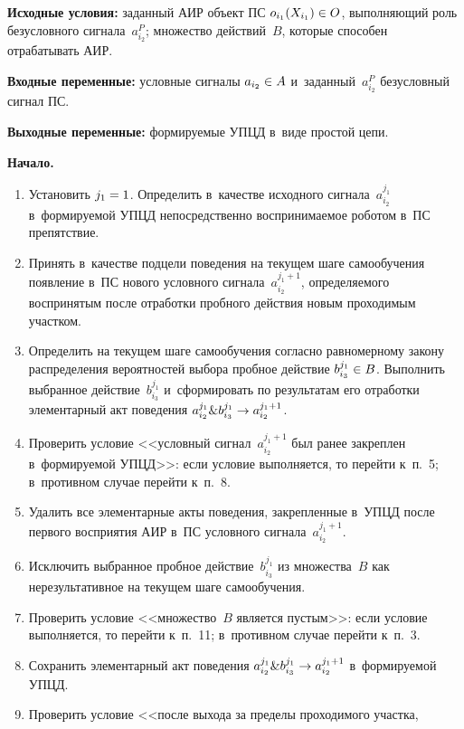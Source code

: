 \begin{multicols}{2}
\noindent
  \textbf{Исходные условия:} заданный АИР объект ПС 
$o_{i_1}(X_{i_1})\hm\in O$, выполняющий роль без\-услов\-но\-го 
сигнала~$a_{i_2}^P$; множество действий~$B$, которые способен 
отрабатывать АИР.
  
 \noindent
  \textbf{Входные переменные:} услов\-ные сигналы $a_{i_2}\hm\in A$ 
и~заданный~$a^P_{i_2}$ безусловный сигнал ПС.
  
 \noindent
  \textbf{Выходные переменные:} фор\-ми\-ру\-емые УПЦД в~виде прос\-той цепи. 
  
\smallskip
  
 \noindent
  \textbf{Начало.}\\[-12pt]
  \begin{enumerate}[1.]
\item  Установить $j_1\hm=1$. Определить в~качестве исходного 
сигнала~$a_{i_2}^{j_1}$ в~фор\-ми\-ру\-емой УПЦД непосредственно 
воспринимаемое роботом в~ПС препятствие. 
  \item  Принять в~качестве подцели поведения на текущем шаге самообучения 
появление в~ПС нового условного сигнала~$a_{i_2}^{j_1+1}$, 
опре\-де\-ля\-емо\-го воспринятым после отработки проб\-но\-го действия новым 
проходимым участ\-ком. 
  \item  Определить на текущем шаге самообучения согласно равномерному 
закону распределения вероятностей выбора проб\-ное действие 
$b^{j_1}_{i_3}\hm\in B$. Выполнить выбранное действие~$b^{j_1}_{i_3}$ 
и~сформировать по результатам его отработки элементарный акт поведения 
$a_{i_2}^{j_1} \& b^{j_1}_{i_3}\hm\to a_{i_2}^{j_1+1}$.
  \item  Проверить условие <<услов\-ный сигнал~$a_{i_2}^{j_1+1}$ был ранее 
закреплен в~формируемой УПЦД>>: если условие выполняется, то перейти 
к~п.~5; в~противном случае перейти к~п.~8.
  \item  Удалить все элементарные акты поведения, за\-креп\-лен\-ные в~УПЦД 
после первого восприятия АИР в~ПС услов\-но\-го 
сигнала~$a_{i_2}^{j_1+1}$.
  \item Исключить выбранное пробное действие~$b_{i_3}^{j_1}$ из 
множества~$B$ как нерезультативное на текущем шаге са\-мо\-обуче\-ния. 
  \item Проверить условие <<множество~$B$ является пус\-тым>>: если условие 
выполняется, то перейти к~п.~11; в~противном случае перейти к~п.~3. 
  \item  Сохранить элементарный акт поведения $a_{i_2}^{j_1} \& 
b_{i_3}^{j_1} \hm\to a_{i_2}^{j_1+1}$ в~фор\-ми\-ру\-емой УПЦД.
  \item  Проверить условие <<после выхода за пределы проходимого участка, 

\end{enumerate}
\end{multicols}
